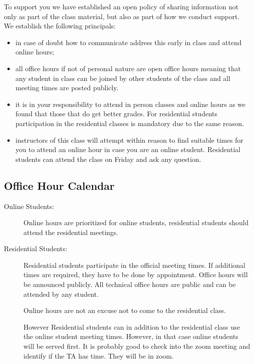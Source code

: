 To support you we have established an open policy of sharing
information not only as part of the class material, but also as part
of how we conduct support. We establish the following principals:

\begin{itemize}

\item in case of doubt how to communicate address this early in class
  and attend online hours;

\item all office hours if not of personal nature are open office hours
  meaning that any student in class can be joined by other students of the
  class and  all meeting times are posted publicly. 

\item it is in your responsibility to attend in person classes and
  online hours as we found that those that do get better grades. For
  residential students participation in the residential classes is
  mandatory due to the same reason.

\item instructors of this class will attempt within reason to find
  suitable times for you to attend an online hour in case you are an
  online student. Residential students can attend the class on Friday
  and ask any question. 

\end{itemize}

\subsection{Office Hour Calendar}
\label{office-hours}

\begin{description}

\item[Online Students:] Online hours are prioritized for online students,
  residential students should attend the residential meetings. 

\item[Residential Students:] Residential students participate in the
  official meeting times. If additional times are required, they have
  to be done by appointment. Office hours will be announced
  publicly. All technical office hours are public and can be
  attended by any student.

  Online hours are not an excuse not to come to the residential class.

  However Residential students can in addition to the residential
  class use the online student meeting times.  However, in that case
  online students will be served first. It is probably good to check
  into the zoom meeting and identify if the TA has time. They will be
  in zoom.

\end{description}

